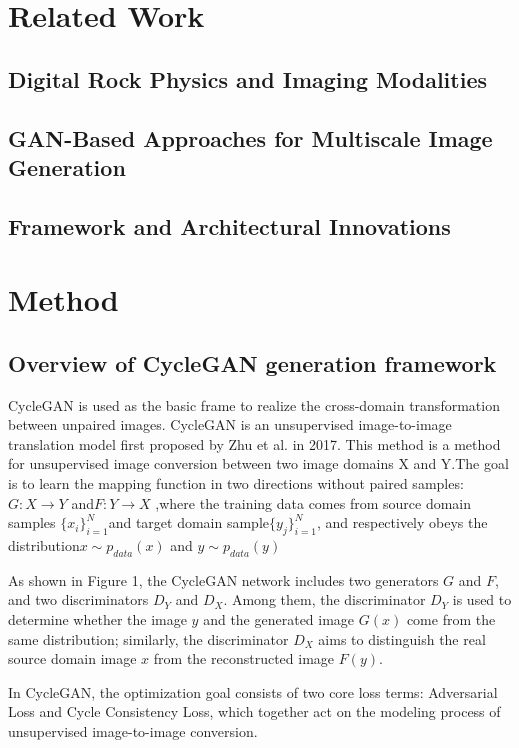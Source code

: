 \documentclass[a4paper,fleqn]{cas-sc}
\begin{document}
\section{Related Work}

\subsection{Digital Rock Physics and Imaging Modalities}

\subsection{GAN-Based Approaches for Multiscale Image Generation}

\subsection{Framework and Architectural Innovations}

\section{Method}


\subsection{Overview of CycleGAN generation framework}

CycleGAN is used as the basic frame to realize the cross-domain transformation between unpaired images. CycleGAN is an unsupervised image-to-image translation model first proposed by Zhu et al. in 2017. This method is a method for unsupervised image conversion between two image domains X and Y.The goal is to learn the mapping function in two directions without paired samples:$G:X \rightarrow Y$ and$F:Y \rightarrow X$ ,where the training data comes from source domain samples $\{x_i\}_{i=1}^N$and target domain sample$\{y_j\}_{i=1}^N$, and respectively obeys the distribution$x \sim p_{data}(x)$ and $y \sim p_{data}(y)$

As shown in Figure 1, the CycleGAN network includes two generators $G$ and $F$, and two discriminators $D_Y$ and $D_X$. Among them, the discriminator $D_Y$ is used to determine whether the image $y$ and the generated image $G(x)$ come from the same distribution; similarly, the discriminator $D_X$ aims to distinguish the real source domain image $x$ from the reconstructed image $F(y)$.

In CycleGAN, the optimization goal consists of two core loss terms: Adversarial Loss and Cycle Consistency Loss, which together act on the modeling process of unsupervised image-to-image conversion.
\end{document}

